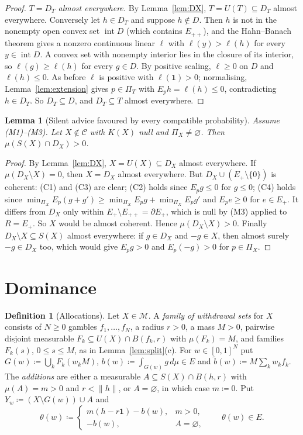 \documentclass[11pt]{article}
\newtheorem{lemma}[theorem]{Lemma}
\theoremstyle{definition}
\newtheorem{definition}[theorem]{Definition}
\theoremstyle{remark}
\newcommand{\M}{\mathcal M}
\newcommand{\C}{\mathcal C}
\newcommand{\one}{\mathbf 1}
\newcommand{\interior}{\operatorname{int}}
\newcommand{\bd}{\partial}
\begin{document}
\begin{proof}
\emph{$T=D_T$ almost everywhere.} By Lemma~\ref{lem:DX}, $T=U(T)\subseteq D_T$ almost everywhere. Conversely let $h\in D_T$ and suppose $h\notin D$. Then $h$ is not in the nonempty open convex set $\interior D$ (which contains $E_{++}$), and the Hahn--Banach theorem gives a nonzero continuous linear $\ell$ with $\ell(y)>\ell(h)$ for every $y\in\interior D$. A convex set with nonempty interior lies in the closure of its interior, so $\ell(g)\ge\ell(h)$ for every $g\in D$. By positive scaling, $\ell\ge0$ on $D$ and $\ell(h)\le0$. As before $\ell$ is positive with $\ell(\one)>0$; normalising, Lemma~\ref{lem:extension} gives $p\in\Pi_T$ with $E_ph=\ell(h)\le0$, contradicting $h\in D_T$. So $D_T\subseteq D$, and $D_T\subseteq T$ almost everywhere.
\end{proof}

\begin{lemma}[Silent advice favoured by every compatible probability]\label{lem:silent}
Assume (M1)--(M3). Let $X\notin\C$ with $K(X)$ null and $\Pi_X\ne\varnothing$. Then $\mu(S(X)\cap D_X)>0$.
\end{lemma}
\begin{proof}
By Lemma~\ref{lem:DX}, $X=U(X)\subseteq D_X$ almost everywhere. If $\mu(D_X\setminus X)=0$, then $X=D_X$ almost everywhere. But $D_X\cup(E_+\setminus\{0\})$ is coherent: (C1) and (C3) are clear; (C2) holds since $E_pg\le0$ for $g\le0$; (C4) holds since $\min_{\Pi_X}E_p(g+g')\ge\min_{\Pi_X}E_pg+\min_{\Pi_X}E_pg'$ and $E_pe\ge0$ for $e\in E_+$. It differs from $D_X$ only within $E_+\setminus E_{++}=\bd E_+$, which is null by (M3) applied to $R=E_+$. So $X$ would be almost coherent. Hence $\mu(D_X\setminus X)>0$. Finally $D_X\setminus X\subseteq S(X)$ almost everywhere: if $g\in D_X$ and $-g\in X$, then almost surely $-g\in D_X$ too, which would give $E_pg>0$ and $E_p(-g)>0$ for $p\in\Pi_X$.
\end{proof}

\section{Dominance}\label{sec:dominance}

\begin{definition}[Allocations]\label{def:allocations}
Let $X\in\M$. A \emph{family of withdrawal sets} for $X$ consists of $N\ge0$ gambles $f_1,\dots,f_N$, a radius $r>0$, a mass $M>0$, pairwise disjoint measurable $F_k\subseteq U(X)\cap B(f_k,r)$ with $\mu(F_k)=M$, and families $F_k(s)$, $0\le s\le M$, as in Lemma~\ref{lem:split}(c). For $w\in[0,1]^N$ put $G(w)\coloneqq\bigcup_kF_k(w_kM)$, $b(w)\coloneqq\int_{G(w)}g\,d\mu\in E$ and $\tilde b(w)\coloneqq M\sum_kw_kf_k$. The \emph{additions} are either a measurable $A\subseteq S(X)\cap B(h,r)$ with $\mu(A)=m>0$ and $r<\|h\|$, or $A=\varnothing$, in which case $m\coloneqq0$. Put $Y_w\coloneqq(X\setminus G(w))\cup A$ and
\[
\theta(w)\coloneqq
\begin{cases}
m(h-r\one)-b(w),&m>0,\\
-b(w),&A=\varnothing,
\end{cases}
\qquad\theta(w)\in E.
\]
\end{definition}
\end{document}

